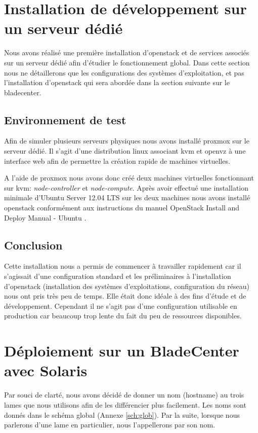 \documentclass[a4paper,oneside]{report}
\begin{document}
\section{Installation de développement sur un serveur dédié}
Nous avons réalisé une première installation d'\gls{openstack} et de services associés sur un serveur dédié afin d'étudier le fonctionnement global.
Dans cette section nous ne détaillerons que les configurations des systèmes d'exploitation, et pas l'installation d'\gls{openstack} qui sera abordée dans la section suivante sur le \gls{bladecenter}.

\subsection{Environnement de test}
Afin de simuler plusieurs serveurs physiques nous avons installé \gls{proxmox} sur le serveur dédié. Il s'agit d'une distribution \gls{linux} associant \gls{kvm} et \gls{openvz} à une interface web afin de permettre la création rapide de machines virtuelles.

A l'aide de \gls{proxmox} nous avons donc créé deux machines virtuelles fonctionnant sur \gls{kvm}: \emph{node-controller} et \emph{node-compute}. Après avoir effectué une installation minimale d'Ubuntu Server 12.04 LTS sur les deux machines nous avons installé \gls{openstack} conformément aux instructions du manuel \og OpenStack Install and Deploy Manual - Ubuntu \fg \cite{OSFolsomInstallUbuntu1210}.

\subsection{Conclusion}
Cette installation nous a permis de commencer à travailler rapidement car il s'agissait d'une configuration standard et les préliminaires à l'installation d'\gls{openstack} (installation des systèmes d'exploitations, configuration du réseau) nous ont pris très peu de temps.
Elle était donc idéale à des fins d'étude et de développement.\newline
Cependant il ne s'agit pas d'une configuration utilisable en production car beaucoup trop lente du fait du peu de ressources disponibles.

\section{Déploiement sur un BladeCenter avec Solaris} \label{sec:depsolaris}

Par souci de clarté, nous avons décidé de donner un nom (hostname) au trois lames que nous utilisons afin de les différencier plus facilement.
Les noms sont donnés dans le schéma global (Annexe \ref{sch:glob}).
Par la suite, lorsque nous parlerons d'une lame en particulier, nous l'appellerons par son nom.
\end{document}
